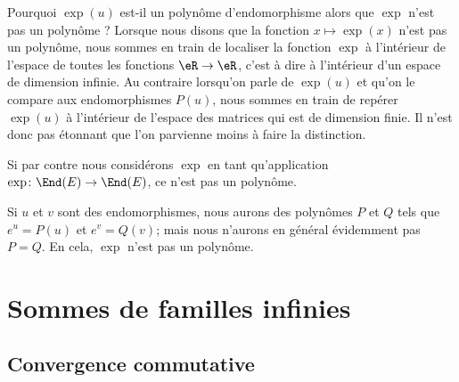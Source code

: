 \begin{remark}
    Pourquoi \( \exp(u)\) est-il un polynôme d'endomorphisme alors que \( \exp\) n'est pas un polynôme ? Lorsque nous disons que la fonction \( x\mapsto \exp(x)\) n'est pas un polynôme, nous sommes en train de localiser la fonction \( \exp\) à l'intérieur de l'espace de toutes les fonctions \( \eR\to \eR\), c'est à dire à l'intérieur d'un espace de dimension infinie. Au contraire lorsqu'on parle de \( \exp(u)\) et qu'on le compare aux endomorphismes \( P(u)\), nous sommes en train de repérer \( \exp(u)\) à l'intérieur de l'espace des matrices qui est de dimension finie. Il n'est donc pas étonnant que l'on parvienne moins à faire la distinction.

    Si par contre nous considérons \( \exp\) en tant qu'application \( \exp\colon \End(E)\to \End(E)\), ce n'est pas un polynôme.

    Si \( u\) et \( v\) sont des endomorphismes, nous aurons des polynômes \( P\) et \( Q\) tels que \( e^u=P(u)\) et \( e^v=Q(v)\); mais nous n'aurons en général évidemment pas \( P=Q\). En cela, \( \exp\) n'est pas un polynôme.
\end{remark}

\section{Sommes de familles infinies}

\subsection{Convergence commutative}


